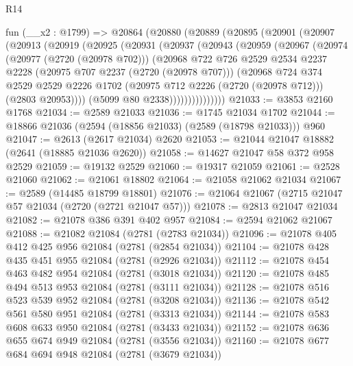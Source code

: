 \begin{lexlean}{R14}
\begin{coremodule}
    fun (__x2 : @1799) =>
    @20864
      (@20880
        (@20889
          (@20895
            (@20901
              (@20907
                (@20913
                  (@20919
                    (@20925
                      (@20931
                        (@20937
                          (@20943
                            (@20959
                              (@20967
                                (@20974
                                  (@20977 (@2720 (@20978 @702)))
                                  (@20968
                                    @722
                                    @726
                                    @2529
                                    @2534
                                    @2237
                                    @2228
                                    (@20975 @707 @2237 (@2720 (@20978 @707)))
                                    (@20968
                                      @724
                                      @374
                                      @2529
                                      @2529
                                      @2226
                                      @1702
                                      (@20975 @712 @2226 (@2720 (@20978 @712)))
                                      (@2803 @20953))))
                                (@5099 @80 @2338)))))))))))))))
@21033 := @3853 @2160 @1768
@21034 := @2589 @21033
@21036 := @1745 @21034 @1702
@21044 := @18866 @21036 (@2594 (@18856 @21033) (@2589 (@18798 @21033))) @960
@21047 := @2613 (@2617 @21034) @2620
@21053 := @21044 @21047 @18882 (@2641 (@18885 @21036 @2620))
@21058 := @14627 @21047 @58 @372 @958 @2529
@21059 := @19132 @2529
@21060 := @19317 @21059
@21061 := @2528 @21060
@21062 := @21061 @18802
@21064 := @21058 @21062 @21034
@21067 := @2589 (@14485 @18799 @18801)
@21076 := @21064 @21067 (@2715 @21047 @57 @21034 (@2720 (@2721 @21047 @57)))
@21078 := @2813 @21047 @21034
@21082 := @21078 @386 @391 @402 @957
@21084 := @2594 @21062 @21067
@21088 := @21082 @21084 (@2781 (@2783 @21034))
@21096 := @21078 @405 @412 @425 @956 @21084 (@2781 (@2854 @21034))
@21104 := @21078 @428 @435 @451 @955 @21084 (@2781 (@2926 @21034))
@21112 := @21078 @454 @463 @482 @954 @21084 (@2781 (@3018 @21034))
@21120 := @21078 @485 @494 @513 @953 @21084 (@2781 (@3111 @21034))
@21128 := @21078 @516 @523 @539 @952 @21084 (@2781 (@3208 @21034))
@21136 := @21078 @542 @561 @580 @951 @21084 (@2781 (@3313 @21034))
@21144 := @21078 @583 @608 @633 @950 @21084 (@2781 (@3433 @21034))
@21152 := @21078 @636 @655 @674 @949 @21084 (@2781 (@3556 @21034))
@21160 := @21078 @677 @684 @694 @948 @21084 (@2781 (@3679 @21034))

\end{coremodule}
\end{lexlean}
